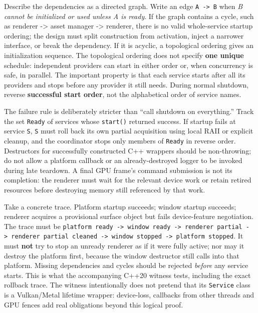 Describe the dependencies as a directed graph. Write an edge \texttt{A\ -\textgreater{}\ B} when \emph{B cannot be initialized or used unless A is ready}. If the graph contains a cycle, such as renderer -\textgreater{} asset manager -\textgreater{} renderer, there is no valid whole-service startup ordering; the design must split construction from activation, inject a narrower interface, or break the dependency. If it is acyclic, a topological ordering gives an initialization sequence. The topological ordering does not specify \textbf{one unique} schedule: independent providers can start in either order or, when concurrency is safe, in parallel. The important property is that each service starts after all its providers and stops before any provider it still needs. During normal shutdown, reverse \textbf{successful start order}, not the alphabetical order of service names.

The failure rule is deliberately stricter than ``call shutdown on everything.'' Track the set \texttt{Ready} of services whose \texttt{start()} returned success. If startup fails at service \texttt{S}, \texttt{S} must roll back its own partial acquisition using local RAII or explicit cleanup, and the coordinator stops only members of \texttt{Ready} in reverse order. Destructors for successfully constructed C++ wrappers should be non-throwing; do not allow a platform callback or an already-destroyed logger to be invoked during late teardown. A final GPU frame's command submission is not its completion: the renderer must wait for the relevant device work or retain retired resources before destroying memory still referenced by that work.

Take a concrete trace. Platform startup succeeds; window startup succeeds; renderer acquires a provisional surface object but fails device-feature negotiation. The trace must be \texttt{platform\ ready\ -\textgreater{}\ window\ ready\ -\textgreater{}\ renderer\ partial\ -\textgreater{}\ renderer\ partial\ cleaned\ -\textgreater{}\ window\ stopped\ -\textgreater{}\ platform\ stopped}. It must \textbf{not} try to stop an unready renderer as if it were fully active; nor may it destroy the platform first, because the window destructor still calls into that platform. Missing dependencies and cycles should be rejected \emph{before} any service starts. This is what the accompanying C++20 witness tests, including the exact rollback trace. The witness intentionally does not pretend that its \texttt{Service} class is a Vulkan/Metal lifetime wrapper: device-loss, callbacks from other threads and GPU fences add real obligations beyond this logical proof.

